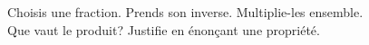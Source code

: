 %
%
Choisis une fraction. Prends son inverse. Multiplie-les ensemble.\\
  Que vaut le produit? Justifie en énonçant une propriété.
